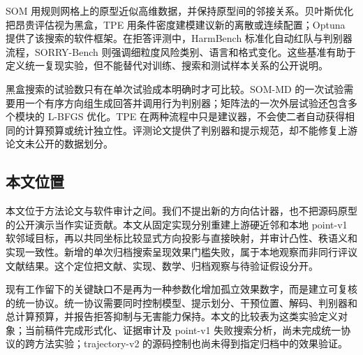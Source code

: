 SOM 用规则网格上的原型近似高维数据，并保持原型间的邻接关系\cite{kohonen2013essentials}。贝叶斯优化把昂贵评估视为黑盒，TPE 用条件密度建模建议新的离散或连续配置\cite{snoek2012practical,bergstra2011algorithms}；Optuna 提供了该搜索的软件框架\cite{akiba2019optuna}。在拒答评测中，HarmBench 标准化自动红队与判别器流程，SORRY-Bench 则强调细粒度风险类别、语言和格式变化\cite{mazeika2024harmbench,xie2025sorrybench}。这些基准有助于定义统一复现实验，但不能替代对训练、搜索和测试样本关系的公开说明。

黑盒搜索的试验数只有在单次试验成本明确时才可比较。SOM-MD 的一次试验需要用一个有序方向组生成回答并调用行为判别器；矩阵法的一次外层试验还包含多个模块的 L-BFGS 优化。TPE 在两种流程中只是建议器，不会使二者自动获得相同的计算预算或统计独立性。评测论文提供了判别器和提示规范，却不能修复上游论文未公开的数据划分。

\subsection{本文位置}

本文位于方法论文与软件审计之间。我们不提出新的方向估计器，也不把源码原型的公开演示当作实证贡献。本文从固定实现分别重建上游硬近邻和本地 point-v1 软邻域目标，再以共同坐标比较显式方向投影与直接映射，并审计凸性、秩语义和实现一致性。新增的单次归档搜索呈现效果门槛失败，属于本地观察而非同行评议文献结果。这个定位把文献、实现、数学、归档观察与待验证假设分开。

现有工作留下的关键缺口不是再为一种参数化增加孤立效果数字，而是建立可复核的统一协议。统一协议需要同时控制模型、提示划分、干预位置、解码、判别器和总计算预算，并报告拒答抑制与无害能力保持。本文的比较表为这类实验定义对象；当前稿件完成形式化、证据审计及 point-v1 失败搜索分析，尚未完成统一协议的跨方法实验；trajectory-v2 的源码控制也尚未得到指定归档中的效果验证。

